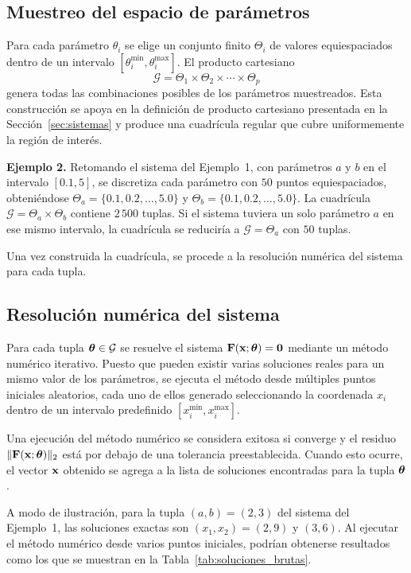 \subsection{Muestreo del espacio de parámetros}

Para cada parámetro \(\theta_i\) se elige un conjunto finito
\(\Theta_i\) de valores equiespaciados dentro de un intervalo
\([\theta_i^{\min}, \theta_i^{\max}]\). El producto cartesiano
\[
\mathcal{G} = \Theta_1 \times \Theta_2 \times \cdots \times \Theta_p
\]
genera todas las combinaciones posibles de los parámetros muestreados. Esta construcción se apoya en la definición de producto cartesiano presentada en la Sección~\ref{sec:sistemas} y produce una cuadrícula regular que cubre uniformemente la región de interés.

\noindent\textbf{Ejemplo 2.} Retomando el sistema del Ejemplo~1, con parámetros \(a\) y \(b\) en el intervalo \([0.1, 5]\), se discretiza cada parámetro con \(50\) puntos equiespaciados, obteniéndose
\(\Theta_a = \{0.1, 0.2, \dots, 5.0\}\) y
\(\Theta_b = \{0.1, 0.2, \dots, 5.0\}\). La cuadrícula
\(\mathcal{G} = \Theta_a \times \Theta_b\) contiene \(2\,500\) tuplas.
Si el sistema tuviera un solo parámetro \(a\) en ese mismo intervalo, la cuadrícula se reduciría a \(\mathcal{G} = \Theta_a\) con \(50\) tuplas.

Una vez construida la cuadrícula, se procede a la resolución numérica del sistema para cada tupla.

\subsection{Resolución numérica del sistema}

Para cada tupla \(\boldsymbol{\theta} \in \mathcal{G}\) se resuelve el sistema
\(\mathbf{F}(\mathbf{x}; \boldsymbol{\theta}) = \mathbf{0}\) mediante un método numérico
iterativo. Puesto que pueden existir varias soluciones reales para un mismo valor de los parámetros, se ejecuta el método desde múltiples puntos iniciales aleatorios, cada uno de ellos generado seleccionando la coordenada \(x_i\) dentro de un intervalo predefinido
\([x_i^{\min}, x_i^{\max}]\).

Una ejecución del método numérico se considera exitosa si converge y el residuo \(\|\mathbf{F}(\mathbf{x}; \boldsymbol{\theta})\|_2\) está por debajo de una tolerancia preestablecida. Cuando esto ocurre, el vector \(\mathbf{x}\) obtenido se agrega a la lista de soluciones encontradas para la tupla
\(\boldsymbol{\theta}\).

A modo de ilustración, para la tupla \((a,b) = (2,3)\) del sistema del Ejemplo~1, las soluciones exactas son \((x_1,x_2) = (2,9)\) y
\((3,6)\). Al ejecutar el método numérico desde varios puntos
iniciales, podrían obtenerse resultados como los que se muestran en la Tabla~\ref{tab:soluciones_brutas}.

